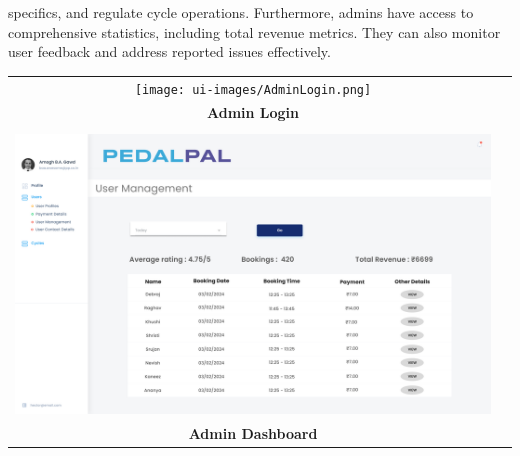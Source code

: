 specifics, and regulate cycle operations. Furthermore, admins have access to comprehensive statistics, including total revenue metrics. They can also monitor user feedback and address reported issues effectively.

\begin{center}
\begin{tabular}{cc}
    \texttt{[image: ui-images/AdminLogin.png]}\\
    \textbf{Admin Login}\\\\
    \includegraphics[scale=0.08]{ui-images/AdminDashboard.png}\\
    \textbf{Admin Dashboard}
\end{tabular}
\end{center}


